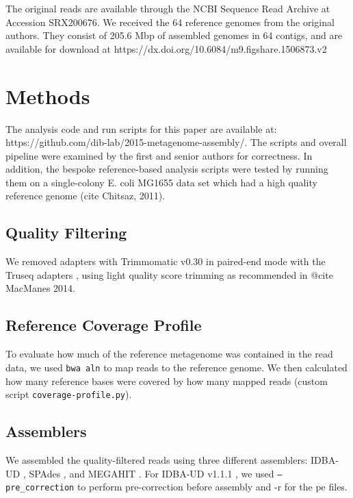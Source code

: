 \documentclass[10pt,a4paper,twocolumn]{article}
\begin{document}
The original reads are available through the NCBI Sequence Read
Archive at Accession SRX200676.
We received the 64 reference genomes from the original authors. They
consist of 205.6 Mbp of assembled genomes in 64 contigs, and are
available for download at
https://dx.doi.org/10.6084/m9.figshare.1506873.v2

\section*{Methods}
The analysis code and run scripts for this paper are available at:
https://github.com/dib-lab/2015-metagenome-assembly/. The scripts and
overall pipeline were examined by the first and senior authors for
correctness.  In addition, the bespoke reference-based analysis
scripts were tested by running them on a single-colony E. coli MG1655
data set which had a high quality reference genome (cite Chitsaz,
2011).

\subsection*{Quality Filtering} 

We removed adapters with Trimmomatic v0.30 in paired-end mode with the
Truseq adapters \cite{trimmomatic}, using light quality score trimming
as recommended in @cite MacManes 2014.


\subsection*{Reference Coverage Profile}

To evaluate how much of the reference metagenome was contained in the read
data, we used {\tt bwa aln} to map reads to the reference genome.  We then
calculated how many reference bases were covered by how many mapped
reads (custom script {\tt coverage-profile.py}).

\subsection*{Assemblers}
We assembled the quality-filtered reads using three different assemblers: IDBA-UD
\cite{idba}, SPAdes \cite{spades}, and MEGAHIT \cite{megahit}.  For
IDBA-UD v1.1.1 \cite{idba}, we used {\tt {--pre\_correction}} to
perform pre-correction before assembly and -r for the pe files.
\end{document}
